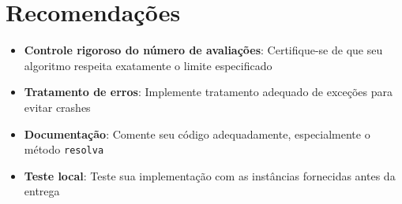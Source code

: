 \documentclass[12pt,a4paper]{article}
\begin{document}
\section{Recomendações}

\begin{itemize}
    \item \textbf{Controle rigoroso do número de avaliações}: Certifique-se de que seu algoritmo respeita exatamente o limite especificado
    
    \item \textbf{Tratamento de erros}: Implemente tratamento adequado de exceções para evitar crashes
    
    \item \textbf{Documentação}: Comente seu código adequadamente, especialmente o método \texttt{resolva}
    
    \item \textbf{Teste local}: Teste sua implementação com as instâncias fornecidas antes da entrega
\end{itemize}







\end{document}

